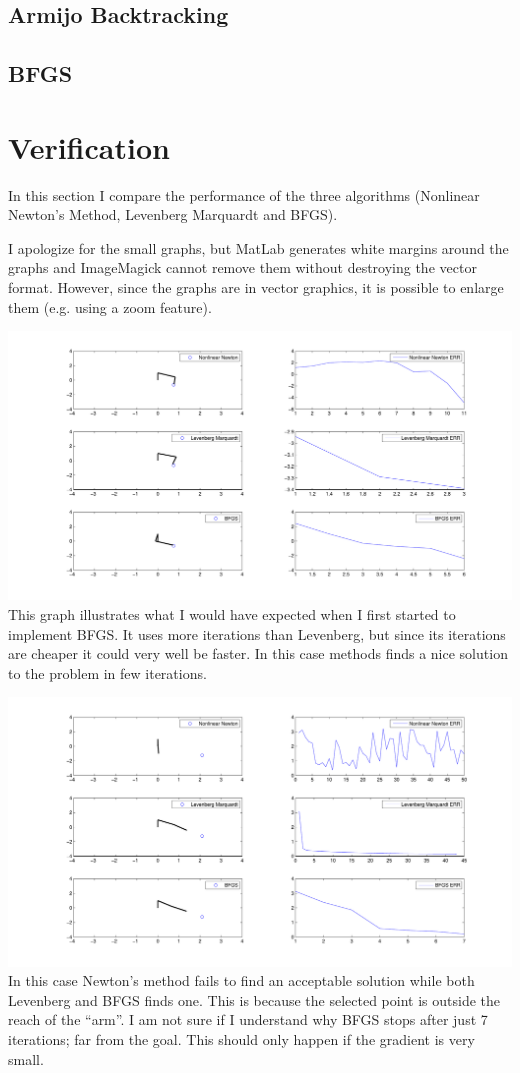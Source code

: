 \documentclass[10pt,oneside,a4paper,final,english]{memoir}
\begin{document}
\subsection{Armijo Backtracking}

\subsection{BFGS}



\section{Verification}
In this section I compare the performance of the three algorithms
(Nonlinear Newton's Method, Levenberg Marquardt and BFGS).

I apologize for the small graphs, but MatLab generates white margins
around the graphs and ImageMagick cannot remove them without
destroying the vector format. However, since the graphs are in vector
graphics, it is possible to enlarge them (e.g. using a zoom feature).

\noindent
\includegraphics[width=\textwidth]{images/graph1.pdf}
This graph illustrates what I would have expected when I first started
to implement BFGS. It uses more iterations than Levenberg, but since
its iterations are cheaper it could very well be faster. In this case
methods finds a nice solution to the problem in few iterations.

\noindent
\includegraphics[width=\textwidth]{images/graph2.pdf}
In this case Newton's method fails to find an acceptable solution
while both Levenberg and BFGS finds one. This is because the selected
point is outside the reach of the ``arm''. I am not sure if I
understand why BFGS stops after just 7 iterations; far from the
goal. This should only happen if the gradient is very small.
\end{document}
